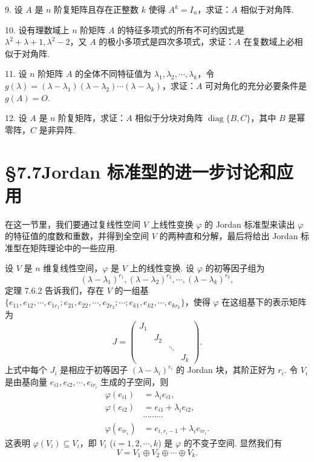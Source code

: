 \documentclass[UTF8, 12pt, fontset=fandol, oneside]{ctexart}
\begin{document}
9. 设 $A$ 是 $n$ 阶复矩阵且存在正整数 $k$ 使得 $A^k=I_n$，求证：$A$ 相似于对角阵.

10. 设有理数域上 $n$ 阶矩阵 $A$ 的特征多项式的所有不可约因式是 $\lambda^2+\lambda+1,\lambda^2-2$，又 $A$ 的极小多项式是四次多项式，求证：$A$ 在复数域上必相似于对角阵.

11. 设 $n$ 阶矩阵 $A$ 的全体不同特征值为 $\lambda_1,\lambda_2,\cdots,\lambda_k$，令 $g(\lambda)=(\lambda-\lambda_1)(\lambda-\lambda_2)\cdots(\lambda-\lambda_k)$，求证：$A$ 可对角化的充分必要条件是 $g(A)=O$.

12. 设 $A$ 是 $n$ 阶复矩阵，求证：$A$ 相似于分块对角阵 $\operatorname{diag}\{B,C\}$，其中 $B$ 是幂零阵，$C$ 是非异阵.

\section*{§7.7\quad Jordan 标准型的进一步讨论和应用}

在这一节里，我们要通过复线性空间 $V$ 上线性变换 $\varphi$ 的 Jordan 标准型来读出 $\varphi$ 的特征值的度数和重数，并得到全空间 $V$ 的两种直和分解，最后将给出 Jordan 标准型在矩阵理论中的一些应用.

设 $V$ 是 $n$ 维复线性空间，$\varphi$ 是 $V$ 上的线性变换. 设 $\varphi$ 的初等因子组为
\begin{equation}
(\lambda-\lambda_1)^{r_1},(\lambda-\lambda_2)^{r_2},\cdots,(\lambda-\lambda_k)^{r_k},
\tag{7.7.1}
\end{equation}
定理 7.6.2 告诉我们，存在 $V$ 的一组基 $\{e_{11},e_{12},\cdots,e_{1r_1};e_{21},e_{22},\cdots,e_{2r_2};\cdots;e_{k1},e_{k2},\cdots,e_{kr_k}\}$，使得 $\varphi$ 在这组基下的表示矩阵为
\[
J=\left(\begin{array}{cccc}
J_1 & & & \\
& J_2 & & \\
& & \ddots & \\
& & & J_k
\end{array}\right).
\]
上式中每个 $J_i$ 是相应于初等因子 $(\lambda-\lambda_i)^{r_i}$ 的 Jordan 块，其阶正好为 $r_i$. 令 $V_i$ 是由基向量 $e_{i1},e_{i2},\cdots,e_{ir_i}$ 生成的子空间，则
\begin{equation}
\begin{aligned}
\varphi(e_{i1})&=\lambda_ie_{i1},\\
\varphi(e_{i2})&=e_{i1}+\lambda_ie_{i2},\\
&\cdots\cdots\cdots\\
\varphi(e_{ir_i})&=e_{i,r_i-1}+\lambda_ie_{ir_i}.
\end{aligned}
\tag{7.7.2}
\end{equation}
这表明 $\varphi(V_i)\subseteq V_i$，即 $V_i$ ($i=1,2,\cdots,k$) 是 $\varphi$ 的不变子空间. 显然我们有
\[
V=V_1\oplus V_2\oplus\cdots\oplus V_k.
\]
\end{document}
